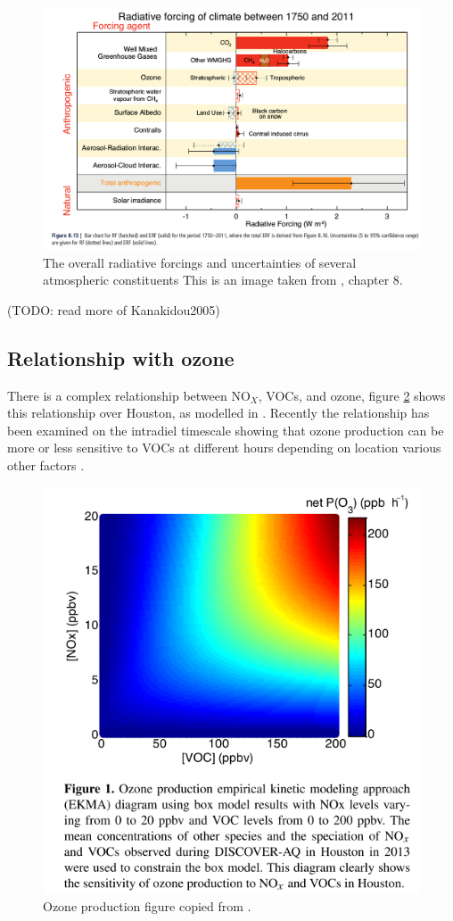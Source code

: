     \begin{figure}
      \includegraphics[width=\textwidth]{Figures/IPCC_WG1AR5_RFSummary.png}
      \caption{%
        The overall radiative forcings and uncertainties of several atmospheric constituents
	      This is an image taken from \cite{IPCC_AR5_WG1}, chapter 8.}
      \label{ch_LitRev:fig:IPCC_RF_AR5}
    \end{figure}    
    
    (TODO: read more of Kanakidou2005)
  \subsection{Relationship with ozone}
    There is a complex relationship between NO$_X$, VOCs, and ozone, figure \ref{ch_LitRev:fig:NOXVOCOzone} shows this relationship over Houston, as modelled in \cite{Mazzuca2016}.
    Recently the relationship has been examined on the intradiel timescale showing that ozone production can be more or less sensitive to VOCs at different hours depending on location various other factors \citep{Mazzuca2016}.
    
    \begin{figure}
      \includegraphics[width=.75\textwidth]{Figures/Mazzuca2016_NOxVOCOzone.png}
      \caption{Ozone production figure copied from \citet{Mazzuca2016}.}
      \label{ch_LitRev:fig:NOXVOCOzone}
    \end{figure}
    
